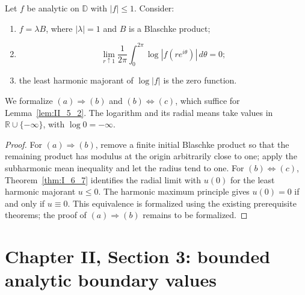 \begin{theorem}
  \label{thm:II_2_4}
  \leanok
  \mainline
  Let $f$ be analytic on $\mathbb D$ with $|f|\le1$. Consider:
  \begin{enumerate}
    \item[(a)] $f=\lambda B$, where $|\lambda|=1$ and $B$ is a Blaschke product;
    \item[(b)]
      \[
        \lim_{r\uparrow1}\frac{1}{2\pi}\int_0^{2\pi}
          \log|f(r e^{i\theta})|\,d\theta=0;
      \]
    \item[(c)] the least harmonic majorant of $\log|f|$ is the zero function.
  \end{enumerate}
  We formalize $(a)\Rightarrow(b)$ and $(b)\Leftrightarrow(c)$, which suffice for
  Lemma~\ref{lem:II_5_2}. The logarithm and its radial means take values in
  $\mathbb R\cup\{-\infty\}$, with $\log0=-\infty$.
  \begin{proof}
    \notready
    For $(a)\Rightarrow(b)$, remove a finite initial Blaschke product so that
    the remaining product has modulus at the origin arbitrarily close to one;
    apply the subharmonic mean inequality and let the radius tend to one.
    For $(b)\Leftrightarrow(c)$, Theorem~\ref{thm:I_6_7} identifies the radial
    limit with $u(0)$ for the least harmonic majorant $u\le0$.
    The harmonic maximum principle gives $u(0)=0$ if and only if $u\equiv0$.
    This equivalence is formalized using the existing prerequisite theorems;
    the proof of $(a)\Rightarrow(b)$ remains to be formalized.
  \end{proof}
\end{theorem}

\section{Chapter II, Section 3: bounded analytic boundary values}

